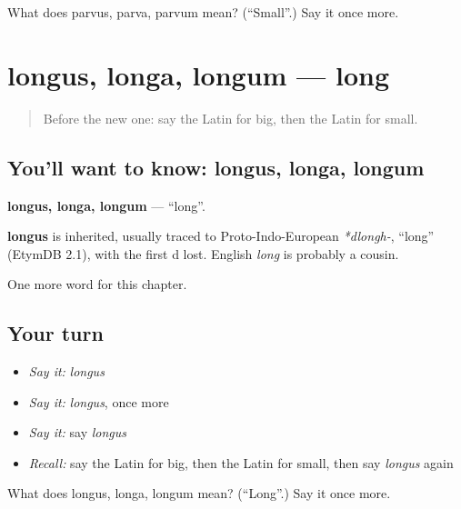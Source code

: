 \begin{tcolorbox}[breakable,colback=teal!4,colframe=teal!35!black,title={Before you move on}]
What does parvus, parva, parvum mean? (\textquotedblleft{}Small\textquotedblright{}.) Say it once more.
\end{tcolorbox}
\section[longus, longa, longum]{longus, longa, longum — long}

\label{lesson:LA-C93-longus}



\begin{quote}
Before the new one: say the Latin for big, then the Latin for small.
\end{quote}

\subsection*{You'll want to know: longus, longa, longum}
\textbf{longus, longa, longum} — \textquotedblleft{}long\textquotedblright{}.

\begin{cousinweb}
\textbf{longus} is inherited, usually traced to Proto-Indo-European \emph{*dlongh-}, \textquotedblleft{}long\textquotedblright{} (EtymDB 2.1), with the first d lost. English \emph{long} is probably a cousin.
\end{cousinweb}

\begin{grammarlens}[title={What you've built}]
One more word for this chapter.
\end{grammarlens}

\subsection*{Your turn}
\begin{itemize}
\raggedright
  \item \emph{Say it:} \emph{longus}
  \item \emph{Say it:} \emph{longus}, once more
  \item \emph{Say it:} say \emph{longus}
  \item \emph{Recall:} say the Latin for big, then the Latin for small, then say \emph{longus} again
\end{itemize}

\begin{tcolorbox}[breakable,colback=teal!4,colframe=teal!35!black,title={Before you move on}]
What does longus, longa, longum mean? (\textquotedblleft{}Long\textquotedblright{}.) Say it once more.
\end{tcolorbox}
